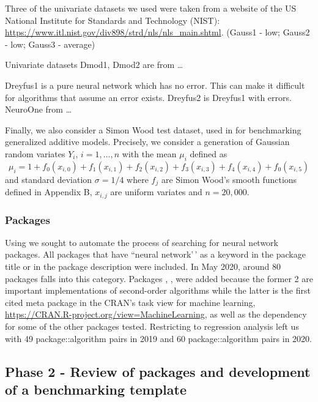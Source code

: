 Three of the univariate datasets we used were taken from a website of
the US National Institute for Standards and Technology (NIST):
\url{https://www.itl.nist.gov/div898/strd/nls/nls_main.shtml}. (Gauss1 -
low; Gauss2 - low; Gauss3 - average)

Univariate datasets Dmod1, Dmod2 are from \ldots{}

Dreyfus1 is a pure neural network which has no error. This can make it
difficult for algorithms that assume an error exists. Dreyfus2 is
Dreyfus1 with errors. NeuroOne from \ldots{}

Finally, we also consider a Simon Wood test dataset, used in
\citep{wood2011fast} for benchmarking generalized additive models.
Precisely, we consider a generation of Gaussian random variates \(Y_i\),
\(i=1,\dots,n\) with the mean \(\mu_i\) defined as \[
\mu_i = 1+ f_0(x_{i,0})+f_1(x_{i,1})+f_2(x_{i,2})+f_3(x_{i,3})
+f_4(x_{i,4})+f_0(x_{i,5})
\] and standard deviation \(\sigma=1/4\) where \(f_j\) are Simon Wood's
smooth functions defined in Appendix B, \(x_{i,j}\) are uniform variates
and \(n=20,000\).

\hypertarget{packages}{%
\subsubsection{Packages}\label{packages}}

Using  \citep{R-RWsearch} we sought to automate the
process of searching for neural network packages. All packages that have
``neural network'\,' as a keyword in the package title or in the package
description were included. In May 2020, around 80 packages falls into
this category. Packages , ,  were
added because the former 2 are important implementations of second-order
algorithms while the latter is the first cited meta package in the
CRAN's task view for machine learning,
\url{https://CRAN.R-project.org/view=MachineLearning}, as well as the
dependency for some of the other packages tested. Restricting to
regression analysis left us with 49 package::algorithm pairs in 2019 and
60 package::algorithm pairs in 2020.

\hypertarget{phase-2---review-of-packages-and-development-of-a-benchmarking-template}{%
\subsection{Phase 2 - Review of packages and development of a
benchmarking
template}\label{phase-2---review-of-packages-and-development-of-a-benchmarking-template}}

